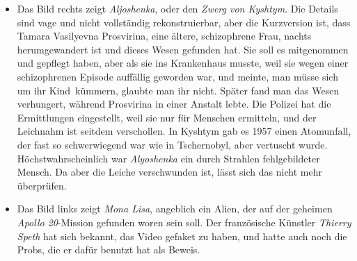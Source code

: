 \documentclass{scrartcl}
\begin{document}
\begin{itemize}
	\item Das Bild rechts zeigt \textit{Aljoshenka}, oder den \textit{Zwerg von Kyshtym}. Die Details sind vage und nicht vollständig rekonstruierbar, aber die Kurzversion ist, dass Tamara Vasilyevna Prosvirina, eine ältere, schizophrene Frau, nachts herumgewandert ist und dieses Wesen gefunden hat. Sie soll es mitgenommen und gepflegt haben, aber als sie ins Krankenhaus musste, weil sie wegen einer schizophrenen Episode auffällig geworden war, und meinte, man müsse sich um \frqq ihr Kind\flqq\ kümmern, glaubte man ihr nicht. Später fand man das Wesen verhungert, während Prosvirina in einer Anstalt lebte. Die Polizei hat die Ermittlungen eingestellt, weil sie \frqq nur für Menschen ermitteln\flqq, und der Leichnahm ist seitdem verschollen. In Kyshtym gab es 1957 einen Atomunfall, der fast so schwerwiegend war wie in Tschernobyl, aber vertuscht wurde. Höchstwahrscheinlich war \textit{Alyoshenka} ein durch Strahlen fehlgebildeter Mensch. Da aber die Leiche verschwunden ist, lässt sich das nicht mehr überprüfen.  
	\item Das Bild links zeigt \textit{Mona Lisa}, angeblich ein Alien, der auf der geheimen \textit{Apollo 20}-Mission gefunden woren sein soll. Der französische Künstler \textit{Thierry Speth} hat sich bekannt, das Video gefaket zu haben, und hatte auch noch die Probs, die er dafür benutzt hat als Beweis.



\end{itemize}
\end{document}
